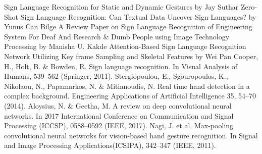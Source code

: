 \documentclass[12pt,a4paper]{report}
\begin{document}
\begin{thebibliography}{00}
	 Sign Language Recognition for Static and Dynamic Gestures by Jay Suthar
	 Zero-Shot Sign Language Recognition: Can Textual Data Uncover Sign Languages? by Yunus Can Bilge
	 A Review Paper on Sign Language Recognition of Engineering System For Deaf And Research \& Dumb People using Image Technology Processing by Manisha U. Kakde
	 Attention-Based Sign Language Recognition Network Utilizing Key frame Sampling and Skeletal Features by Wei Pan
	 Cooper, H., Holt, B. \& Bowden, R. Sign language recognition. In Visual Analysis of Humans, 539–562 (Springer, 2011).
	 Stergiopoulou, E., Sgouropoulos, K., Nikolaou, N., Papamarkos, N. \& Mitianoudis, N. Real time hand detection in a complex background. Engineering Applications of Artificial Intelligence 35, 54–70 (2014).
	 Aloysius, N. \& Geetha, M. A review on deep convolutional neural networks. In 2017 International Conference on Communication and Signal Processing (ICCSP), 0588–0592 (IEEE, 2017).
	 Nagi, J. et al. Max-pooling convolutional neural networks for vision-based hand gesture recognition. In Signal and Image Processing Applications(ICSIPA), 342–347 (IEEE, 2011).


\end{thebibliography}
\end{document}
